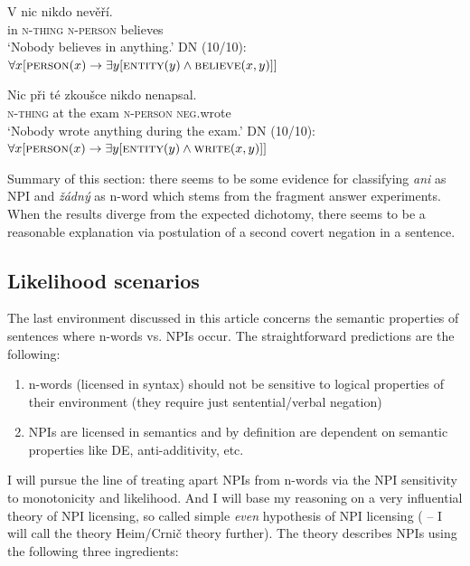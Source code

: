 \documentclass[output=paper,
]{langscibook}
\begin{document}
\ea\label{ex-39}  \gll V nic nikdo nevěří.\\
in \textsc{n-thing} \textsc{n-person} believes\\
\glt `Nobody believes in anything.'
\ex  DN (10/10): $\forall x[\textsc{person}(x) \rightarrow \exists y[\textsc{entity}(y) \wedge \textsc{believe}(x,y)]]$
\z
\z

\ea\label{ex-40} \gll Nic při té zkoušce nikdo nenapsal.\\
\textsc{n-thing} at the exam \textsc{n-person} \textsc{neg}.wrote\\
\glt `Nobody wrote anything during the exam.'
\ex DN (10/10): $\forall x[\textsc{person}(x) \rightarrow \exists y[\textsc{entity}(y) \wedge \textsc{write}(x,y)]]$
\z
\z

\noindent Summary of this section: there seems to be some evidence for classifying \textit{ani} as NPI and \textit{žádný} as n-word which stems from the fragment answer experiments. When the results diverge from the expected dichotomy, there seems to be a reasonable explanation via postulation of a second covert negation in a sentence.

\subsection{Likelihood scenarios}\label{likelihood-scenarios}

The last environment discussed in this article concerns the semantic properties of sentences where n-words vs. NPIs occur. The straightforward predictions are the following:

\begin{enumerate}
  \def\labelenumi{\arabic{enumi})}
  \item
    n-words (licensed in syntax) should not be sensitive to logical properties of
    their environment (they require just sentential/verbal negation)
  \item
    NPIs are licensed in semantics and by definition are dependent on semantic properties like DE, anti-additivity, etc.
\end{enumerate}

\noindent I will pursue the line of treating apart NPIs from n-words via the NPI sensitivity to monotonicity and likelihood. And I will base my reasoning on a very influential theory of NPI licensing, so called simple
  \textit{even} hypothesis of NPI licensing (\citealt{heim1984note,krifka1995semantics,crnivc2014against} -- I will call the theory Heim/Crnič theory further). The theory describes NPIs using the following three ingredients:
\end{document}
